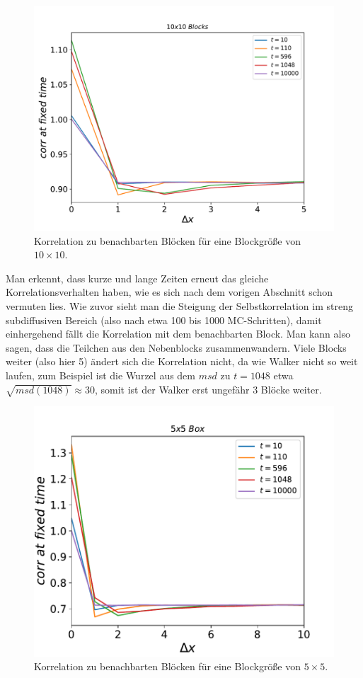 \documentclass[a4paper, 12pt]{report}
\begin{document}
\begin{figure}[h!]
	\centering
	\includegraphics[scale=0.8]{corr10.pdf}
	\caption{Korrelation zu benachbarten Blöcken für eine Blockgröße von $10\times 10$.}
\end{figure}

\noindent Man erkennt, dass kurze und lange Zeiten erneut das gleiche Korrelationsverhalten haben, wie es sich nach dem vorigen Abschnitt schon vermuten lies. Wie zuvor sieht man die Steigung der Selbstkorrelation im streng subdiffusiven Bereich (also nach etwa 100 bis 1000 MC-Schritten), damit einhergehend fällt die Korrelation mit dem benachbarten Block. Man kann also sagen, dass die Teilchen aus den Nebenblocks zusammenwandern. Viele Blocks weiter (also hier 5) ändert sich die Korrelation nicht, da wie Walker nicht so weit laufen, zum Beispiel ist die Wurzel aus dem $msd$ zu $t=1048$ etwa $\sqrt{msd(1048)} \approx 30$, somit ist der Walker erst ungefähr 3 Blöcke weiter. 


\begin{figure}[h!]
	\centering
	\includegraphics[scale=1]{corr5.pdf}
	\caption{Korrelation zu benachbarten Blöcken für eine Blockgröße von $5\times 5$.}
\end{figure}
\end{document}
